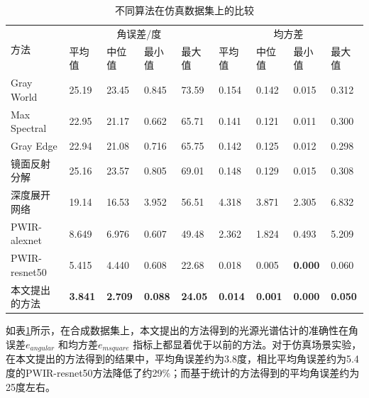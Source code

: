 \documentclass[
    type = master, %
    degree = academic,        %
    decl-page,  %
  ]{njuthesis}
\begin{document}
\begin{table}[h]
\centering                %
\caption{不同算法在仿真数据集上的比较} 
\label{tab:illu syn}
\begin{tabular}{l|llll llll}
\hline
\multirow{2}{*}{方法} & \multicolumn{4}{c}{角误差/度}                                           & \multicolumn{4}{c}{均方差}                                           \\
                    & 平均值            & 中位值            & 最小值            & 最大值            & 平均值            & 中位值            & 最小值            & 最大值            \\ \hline
Gray World          & 25.19          & 23.45          & 0.845          & 73.59          & 0.154          & 0.142          & 0.015          & 0.312          \\
Max Spectral            & 22.95          & 21.17          & 0.662          & 65.71          & 0.141          & 0.121          & 0.011          & 0.300          \\
Gray Edge           & 22.94          & 21.08          & 0.716          & 65.75          & 0.142          & 0.125          & 0.012          & 0.298          \\
镜面反射分解                & 25.16          & 23.57          & 0.805          & 69.01          & 0.148          & 0.129          & 0.015          & 0.308          \\
深度展开网络               & 19.14          & 16.53          & 3.952          & 56.51          & 4.318          & 3.871          & 2.305          & 6.832          \\
PWIR-alexnet      & 8.649          & 6.976          & 0.607          & 49.48          & 2.362          & 1.824          & 0.493 & 5.209          \\   
PWIR-resnet50      & 5.415          & 4.440          & 0.608          & 22.68          & 0.018          & 0.005          & \textbf{0.000}          & 0.060          \\
本文提出的方法                 & \textbf{3.841} & \textbf{2.709} & \textbf{0.088} & \textbf{24.05} & \textbf{0.014} & \textbf{0.001} & \textbf{0.000} & \textbf{0.050} \\ \hline
\end{tabular}
\end{table}



如表\ref{tab:illu syn}所示，在合成数据集上，本文提出的方法得到的光源光谱估计的准确性在角误差$e_{angular}$ 和均方差$e_{msquare}$ 指标上都显着优于以前的方法。对于仿真场景实验，在本文提出的方法得到的结果中，平均角误差约为3.8度，相比平均角误差约为5.4度的PWIR-resnet50方法降低了约29\%；而基于统计的方法得到的平均角误差约为25度左右。
\end{document}
